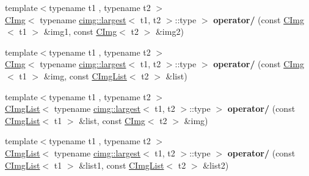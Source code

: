 \begin{DoxyCompactItemize}
\item 
\hypertarget{namespacecimg__library_a64486a79228419562645ee7e6c75b788}{
{\footnotesize template$<$typename t1 , typename t2 $>$ }\\\hyperlink{structcimg__library_1_1_c_img}{CImg}$<$ typename \hyperlink{structcimg__library_1_1cimg_1_1largest}{cimg::largest}$<$ t1, t2 $>$::type $>$ {\bfseries operator/} (const \hyperlink{structcimg__library_1_1_c_img}{CImg}$<$ t1 $>$ \&img1, const \hyperlink{structcimg__library_1_1_c_img}{CImg}$<$ t2 $>$ \&img2)}
\label{namespacecimg__library_a64486a79228419562645ee7e6c75b788}

\item 
\hypertarget{namespacecimg__library_a0ce4e93c92ee22ae388376b9a2a47143}{
{\footnotesize template$<$typename t1 , typename t2 $>$ }\\\hyperlink{structcimg__library_1_1_c_img}{CImg}$<$ typename \hyperlink{structcimg__library_1_1cimg_1_1largest}{cimg::largest}$<$ t1, t2 $>$::type $>$ {\bfseries operator/} (const \hyperlink{structcimg__library_1_1_c_img}{CImg}$<$ t1 $>$ \&img, const \hyperlink{structcimg__library_1_1_c_img_list}{CImgList}$<$ t2 $>$ \&list)}
\label{namespacecimg__library_a0ce4e93c92ee22ae388376b9a2a47143}

\item 
\hypertarget{namespacecimg__library_aeb99ee7f0c15654b8d485964184a371f}{
{\footnotesize template$<$typename t1 , typename t2 $>$ }\\\hyperlink{structcimg__library_1_1_c_img_list}{CImgList}$<$ typename \hyperlink{structcimg__library_1_1cimg_1_1largest}{cimg::largest}$<$ t1, t2 $>$::type $>$ {\bfseries operator/} (const \hyperlink{structcimg__library_1_1_c_img_list}{CImgList}$<$ t1 $>$ \&list, const \hyperlink{structcimg__library_1_1_c_img}{CImg}$<$ t2 $>$ \&img)}
\label{namespacecimg__library_aeb99ee7f0c15654b8d485964184a371f}

\item 
\hypertarget{namespacecimg__library_af2f9871065d1a621eacb0ae816123576}{
{\footnotesize template$<$typename t1 , typename t2 $>$ }\\\hyperlink{structcimg__library_1_1_c_img_list}{CImgList}$<$ typename \hyperlink{structcimg__library_1_1cimg_1_1largest}{cimg::largest}$<$ t1, t2 $>$::type $>$ {\bfseries operator/} (const \hyperlink{structcimg__library_1_1_c_img_list}{CImgList}$<$ t1 $>$ \&list1, const \hyperlink{structcimg__library_1_1_c_img_list}{CImgList}$<$ t2 $>$ \&list2)}
\label{namespacecimg__library_af2f9871065d1a621eacb0ae816123576}

\end{DoxyCompactItemize}


